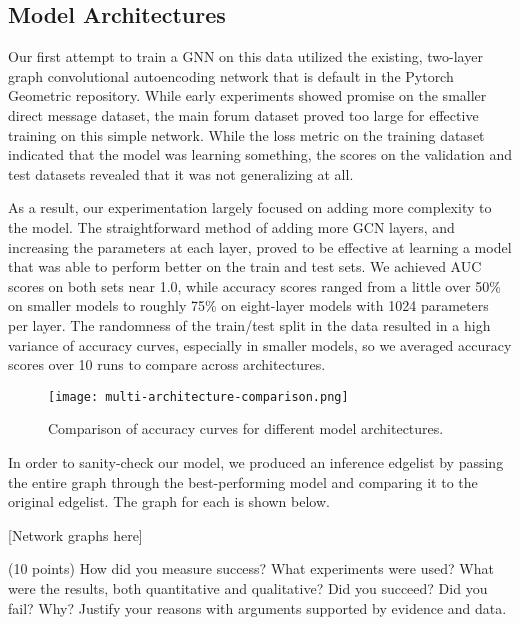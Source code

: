 \documentclass[10pt,twocolumn,letterpaper]{article}
\begin{document}
\subsection{Model Architectures}

Our first attempt to train a GNN on this data utilized the existing, two-layer graph convolutional autoencoding network that is default in the Pytorch Geometric repository. While early experiments showed promise on the smaller direct message dataset, the main forum dataset proved too large for effective training on this simple network. While the loss metric on the training dataset indicated that the model was learning something, the scores on the validation and test datasets revealed that it was not generalizing at all. 

As a result, our experimentation largely focused on adding more complexity to the model. The straightforward method of adding more GCN layers, and increasing the parameters at each layer, proved to be effective at learning a model that was able to perform better on the train and test sets. We achieved AUC scores on both sets near 1.0, while accuracy scores ranged from a little over 50\% on smaller models to roughly 75\% on eight-layer models with 1024 parameters per layer. The randomness of the train/test split in the data resulted in a high variance of accuracy curves, especially in smaller models, so we averaged accuracy scores over 10 runs to compare across architectures.

\begin{figure}[t]
\begin{center}

   \texttt{[image: multi-architecture-comparison.png]}
\end{center}
   \caption{Comparison of accuracy curves for different model architectures.}
\label{fig:long}
\label{fig:onecol}
\end{figure}


In order to sanity-check our model, we produced an inference edgelist by passing the entire graph through the best-performing model and comparing it to the original edgelist. The graph for each is shown below. 

[Network graphs here]

(10 points) How did you measure success? What experiments were used? What were the results, both quantitative and qualitative? Did you succeed? Did you fail? Why? Justify your reasons with arguments supported by evidence and data.
\end{document}
